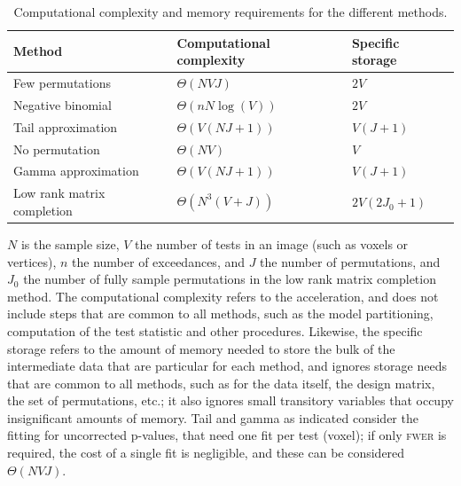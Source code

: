 \begin{table}[!tp]
\caption[Computational complexity and memory requirements for the different methods.]{Computational complexity and memory requirements for the different methods.}
\vspace{-2mm}
\begin{center}
{\small
\begin{tabular}{@{}m{55mm}<{\raggedright}m{40mm}<{\raggedright}@{}m{19mm}<{\raggedright}@{}}
\toprule
Method & Computational complexity & Specific storage\\
\midrule
Few permutations           & $\Theta(NVJ)$       & $2V$\\
Negative binomial          & $\Theta(nN\log(V))$ & $2V$\\
Tail approximation         & $\Theta(V(NJ+1))$   & $V(J+1)$\\
No permutation             & $\Theta(NV)$        & $V$\\
Gamma approximation        & $\Theta(V(NJ+1))$   & $V(J+1)$\\
Low rank matrix completion & $\Theta(N^3(V+J))$  & $2V(2J_0+1)$\\
\bottomrule
\end{tabular}}
\end{center}
{\footnotesize
$N$ is the sample size, $V$ the number of tests in an image (such as voxels or vertices), $n$ the number of exceedances, and $J$ the number of permutations, and $J_0$ the number of fully sample permutations in the low rank matrix completion method. The computational complexity refers to the acceleration, and does not include steps that are common to all methods, such as the model partitioning, computation of the test statistic and other procedures. Likewise, the specific storage refers to the amount of memory needed to store the bulk of the intermediate data that are particular for each method, and ignores storage needs that are common to all methods, such as for the data itself, the design matrix, the set of permutations, etc.; it also ignores small transitory variables that occupy insignificant amounts of memory. Tail and gamma as indicated consider the fitting for uncorrected p-values, that need one fit per test (voxel); if only \textsc{fwer} is required, the cost of a single fit is negligible, and these can be considered $\Theta(NVJ)$.\par}
\label{tab:complexity}
\end{table}

